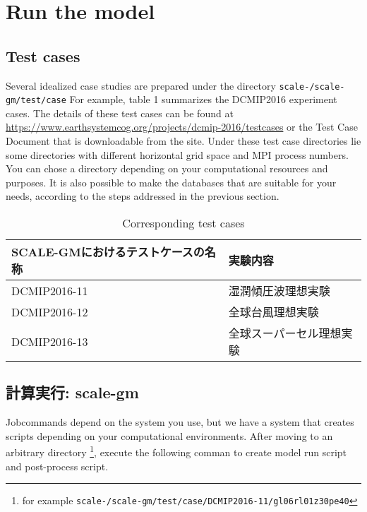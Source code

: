 
\section{Run the model}
\subsection{Test cases}

Several idealized case studies are prepared under the directory 
\noindent \texttt{scale-{\version}/scale-gm/test/case} 
For example, table 1 summarizes the DCMIP2016 experiment cases.
The details of these test cases can be found at 
\url{https://www.earthsystemcog.org/projects/dcmip-2016/testcases}
or the Test Case Document that is downloadable from the site.
Under these test case directories lie some directories with 
different horizontal grid space and MPI process numbers. 
You can chose a directory depending on your computational resources 
and purposes.
It is also possible to make the databases that are suitable for your needs,
according to the steps addressed in the previous section.
 \begin{table}[h]
 \begin{center}
 \caption{Corresponding test cases}
 \begin{tabularx}{150mm}{|l|X|} \hline
 \rowcolor[gray]{0.9} SCALE-GMにおけるテストケースの名称 & 実験内容 \\ \hline
  DCMIP2016-11 & 湿潤傾圧波理想実験  \\ \hline
  DCMIP2016-12 & 全球台風理想実験 \\ \hline
  DCMIP2016-13 & 全球スーパーセル理想実験 \\ \hline
 \end{tabularx}
 \end{center}
 \end{table}


\subsection{計算実行: scale-gm}

Jobcommands depend on the system you use, but we have a system 
that creates scripts depending on your computational environments.
After moving to an arbitrary directory \footnote{for example
  \texttt{scale-{\version}/scale-gm/test/case/DCMIP2016-11/gl06rl01z30pe40}},
execute the following comman to create model run script and post-process script.

